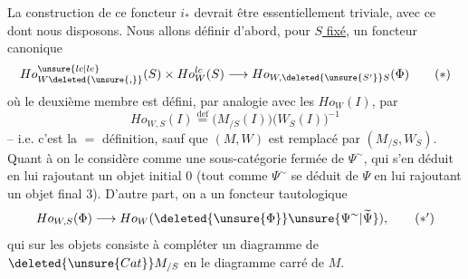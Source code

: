 La construction de ce foncteur $i_*$ devrait être essentiellement triviale, avec ce dont nous disposons. Nous allons  définir d'abord,  pour \uline{$S$ fixé}, un foncteur canonique
\[
 Ho^{\unsure{lc|le}}_{W\deleted{\unsure{,}}}(S)\times Ho^{lc}_{W}(S)
 \longrightarrow Ho_{W,\deleted{\unsure{S'}}S}(\Phi) \tag*{$(*)$}
\]
où le deuxième membre est défini, par analogie avec les $Ho_W(I)$, par
\[
 Ho_{W,S}(I)\overset{\mathrm{def}}{=}
 \bigl(M_{/S}(I)\bigr)\bigl(W_S(I)\bigr)^{-1}
\]
-- i.e. c'est la $=$ définition, sauf que $(M,W)$ est remplacé par $(M_{/S},W_S)$. Quant à
on le considère comme une sous-catégorie fermée de $\Psi^{\sim}$, qui s'en déduit en lui rajoutant un objet initial $0$ (tout comme $\Psi^{\sim}$ se déduit de $\Psi$ en lui rajoutant un objet final $3$). D'autre part, on a un foncteur tautologique
\[
 Ho_{W,S}(\Phi)\longrightarrow Ho_W(\deleted{\unsure{\Phi}}\unsure{\Psi^{\sim}|\widetilde\Psi}),
 \tag*{$(*')$}
\]
qui sur les objets consiste à compléter un diagramme
de $\deleted{\unsure{Cat}}M_{/S}$ en le diagramme carré
de $M$.




